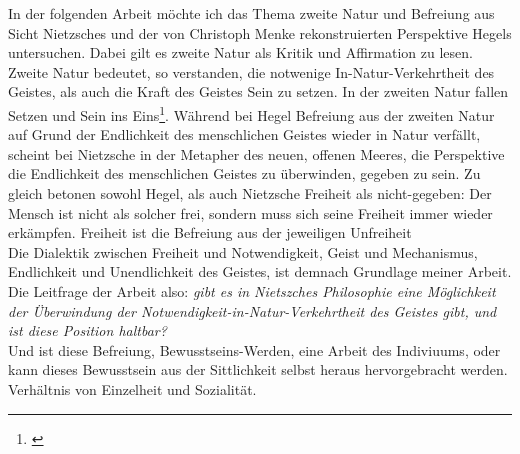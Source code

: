 \documentclass[a4paper, 12pt]{article}
\begin{document}
In der folgenden Arbeit möchte ich das Thema zweite Natur und Befreiung aus Sicht Nietzsches und der von Christoph Menke rekonstruierten Perspektive Hegels untersuchen.
Dabei gilt es zweite Natur als Kritik und Affirmation zu lesen. 
Zweite Natur bedeutet, so verstanden, die notwenige In-Natur-Verkehrtheit des Geistes, als auch die Kraft des Geistes Sein zu setzen. 
In der zweiten Natur fallen Setzen und Sein ins Eins\footnote{\citeauthor[Vgl.][144]{menke_autonomie_2018}}.
Während bei Hegel Befreiung aus der zweiten Natur auf Grund der Endlichkeit des menschlichen Geistes wieder in Natur verfällt, scheint bei Nietzsche in der Metapher des neuen, offenen Meeres, die Perspektive die Endlichkeit des menschlichen Geistes zu überwinden, gegeben zu sein. 
Zu gleich betonen sowohl Hegel, als auch Nietzsche Freiheit als nicht-gegeben: 
Der Mensch ist nicht als solcher frei, sondern muss sich seine Freiheit immer wieder erkämpfen.
Freiheit ist die Befreiung aus der jeweiligen Unfreiheit\\
Die Dialektik zwischen Freiheit und Notwendigkeit, Geist und Mechanismus, Endlichkeit und Unendlichkeit des Geistes, ist demnach Grundlage meiner Arbeit.
Die Leitfrage der Arbeit also: \textit{gibt es in Nietszches Philosophie eine Möglichkeit der Überwindung der Notwendigkeit-in-Natur-Verkehrtheit des Geistes gibt, und ist diese Position haltbar?}\\
Und ist diese Befreiung, Bewusstseins-Werden, eine Arbeit des Indiviuums, oder kann dieses Bewusstsein aus der Sittlichkeit selbst heraus hervorgebracht werden.
Verhältnis von Einzelheit und Sozialität.
\end{document}
